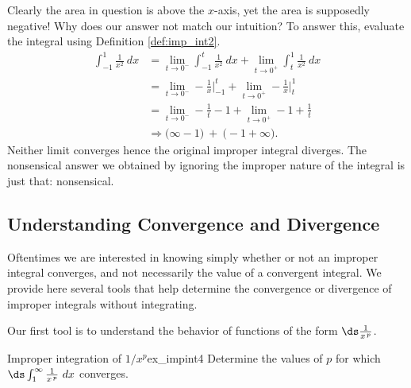 \begin{solution}
{\begin{enumerate}
{
}
Clearly the area in question is above the $x$-axis, yet the area is supposedly negative! Why does our answer not match our intuition? To answer this, evaluate the integral using Definition \ref{def:imp_int2}.
\begin{align*}
\int_{-1}^1\frac1{x^2}\ dx &= \lim_{t\to0^-}\int_{-1}^t \frac1{x^2}\ dx + \lim_{t\to0^+}\int_t^1\frac1{x^2}\ dx \\
			&= \lim_{t\to0^-}-\frac1x\Big|_{-1}^t + \lim_{t\to0^+}-\frac1x\Big|_t^1\\
			&= \lim_{t\to0^-}-\frac1t-1 + \lim_{t\to0^+} -1+\frac1t\\
			&\Rightarrow \Big(\infty-1\Big)\ + \ \Big(- 1+\infty\Big).
\end{align*}
Neither limit converges hence the original improper integral diverges. The nonsensical answer we obtained by ignoring the improper nature of the integral is just that: nonsensical.
\end{enumerate}
}
\end{solution}




\subsection*{ Understanding Convergence and Divergence}

Oftentimes we are interested in knowing simply whether or not an improper integral converges, and not necessarily the value of a convergent integral. We provide here several tools that help determine the convergence or divergence of improper integrals without integrating.

Our first tool is to understand the behavior of functions of the form $\ds \frac1{x\hskip1pt ^p}$.\\

\begin{example}{Improper integration of $1/x^p$}{ex_impint4}
{
Determine the values of $p$ for which $\ds \int_1^\infty \frac1{x\hskip1pt ^p}\ dx$ converges.
}
\end{example}


